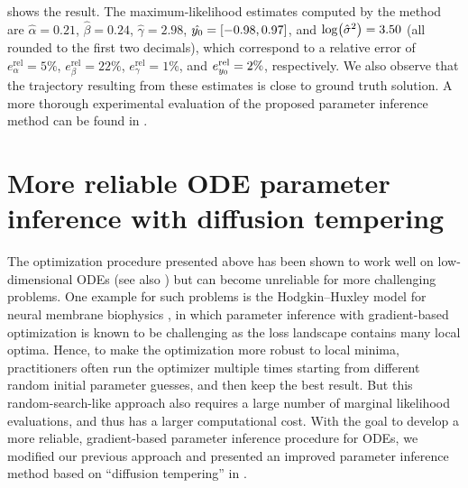 \documentclass{mimosis}
\begin{document}
 shows the result.
The maximum-likelihood estimates computed by the method are
\(\hat{\alpha}=0.21\),
\(\hat{\beta}=0.24\),
\(\hat{\gamma}=2.98\),
\(\hat{y_0}=[-0.98,0.97]\), and
\(\log(\hat{\sigma}^2)=3.50\) (all rounded to the first two decimals),
which correspond to a relative error of
\({e^\text{rel}_\alpha  = 5\%}\),
\({e^\text{rel}_\beta  = 22\%}\),
\({e^\text{rel}_\gamma  = 1\%}\), and
\({e^\text{rel}_{y_0}  = 2\%}\), respectively.
We also observe that the trajectory resulting from these estimates is close to ground truth solution.
A more thorough experimental evaluation of the proposed parameter inference method can be found in
\fenrir{}.
\section{More reliable ODE parameter inference with diffusion tempering}
\label{sec:org55748a9}
\label{sec:tempering}
The optimization procedure presented above has been shown to work well on low-dimensional ODEs (see also \fenrir{})
but can become unreliable for more challenging problems.
One example for such problems is the Hodgkin--Huxley model for neural membrane biophysics
\parencite{hodgkinhuxley1952},
in which parameter inference with gradient-based optimization is known to be challenging as the loss landscape contains many local optima.
Hence, to make the optimization more robust to local minima, practitioners often run the optimizer multiple times starting from different random initial parameter guesses, and then keep the best result.
But this random-search-like approach also requires a large number of marginal likelihood evaluations, and thus has a larger computational cost.
With the goal to develop a more reliable, gradient-based parameter inference procedure for ODEs, we modified our previous approach and presented an improved parameter inference method based on ``diffusion tempering'' in \tempering{}.
\end{document}

